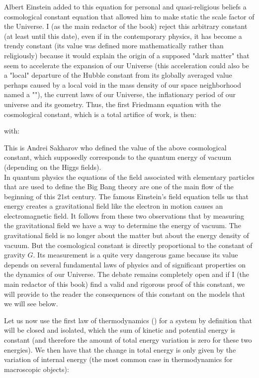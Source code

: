 	
	\pagebreak
	\begin{tcolorbox}[title=Remark,colframe=black,arc=10pt]
	Albert Einstein added to this equation for personal and quasi-religious beliefs a cosmological constant equation that allowed him to make static the scale factor of the Universe. I (as the main redactor of the book) reject this arbitrary constant (at least until this date), even if in the contemporary physics, it has become a trendy constant (its value was defined more mathematically rather than religiously) because it would explain the origin of a supposed "dark matter" that seem to accelerate the expansion of our Universe (this acceleration could also be a "local" departure of the Hubble constant from its globally averaged value perhaps caused by a local void in the mass density of our space neighborhood named a ""), the current laws of our Universe, the inflationary period of our universe and its geometry. Thus, the first Friedmann equation with the cosmological constant, which is a total artifice of work, is then: 
	
	with:
	
	This is Andrei Sakharov who defined the value of the above cosmological constant, which supposedly corresponds to the quantum energy of vacuum (depending on the Higgs fields).\\
	
	In quantum physics the equations of the field associated with elementary particles that are used to define the Big Bang theory are one of the main flow of the beginning of this 21st century. The famous Einstein's field equation tells us that energy creates a gravitational field like the electron in motion causes an electromagnetic field. It follows from these two observations that by measuring the gravitational field we have a way to determine the energy of vacuum. The gravitational field is no longer about the matter but about the energy density of vacuum. But the cosmological constant is directly proportional to the constant of gravity $G$. Its measurement is a quite very dangerous game because its value depends on several fundamental laws of physics and of significant properties on the dynamics of our Universe. The debate remains completely open and if I (the main redactor of this book) find a valid and rigorous proof of this constant, we will provide to the reader the  consequences of this constant on the models that we will see below.
	\end{tcolorbox}
	Let us now use the first law of thermodynamics () for a system by definition that will be closed and isolated, which the sum of kinetic and potential energy is constant (and therefore the amount of total energy variation is zero for these two energies). We then have that the change in total energy is only given by the variation of internal energy (the most common case in thermodynamics for macroscopic objects):
	
